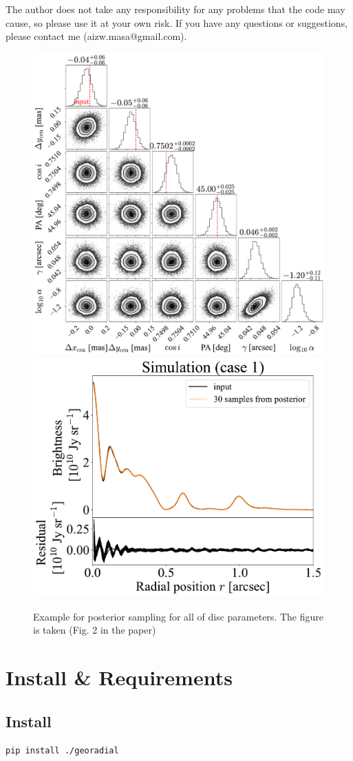 \documentclass{report}
\begin{document}
The author does not take any responsibility for any problems that the code may cause, so please use it at your own risk. If you have any questions or suggestions, please contact me (aizw.masa@gmail.com).
\begin{figure}
\begin{center}
\includegraphics[width=0.48\linewidth]{./fig/recovered_sim_mcmc.pdf}
\includegraphics[width=0.48\linewidth]{./fig/posterior_sim.pdf}
\end{center}
\caption{Example for posterior sampling for all of disc parameters. The figure is taken \protect \cite{aizawa2024} (Fig. 2 in the paper)}
\label{fig:posterior_sim}
\end{figure}


\chapter{Install \& Requirements \label{sec:reuired}}
\section{Install}

\begin{verbatim}
pip install ./georadial
\end{verbatim}
\end{document}
